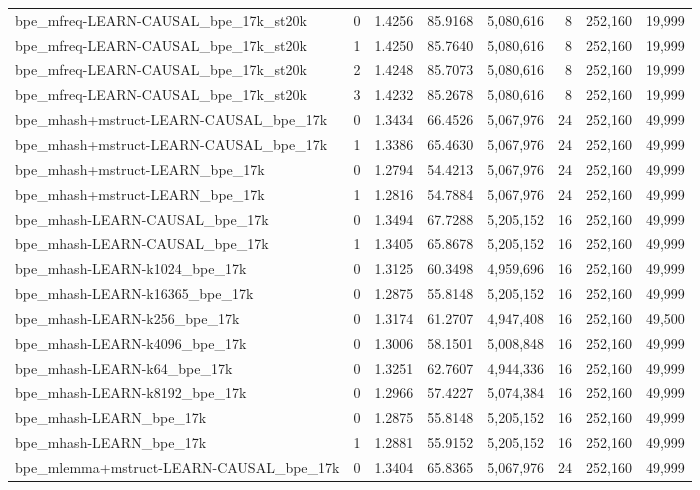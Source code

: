 \begin{tabular}{lrrrrrrr}
bpe\_mfreq-LEARN-CAUSAL\_bpe\_17k\_st20k & 0 & 1.4256 & 85.9168 & 5,080,616 & 8 & 252,160 & 19,999 \\
bpe\_mfreq-LEARN-CAUSAL\_bpe\_17k\_st20k & 1 & 1.4250 & 85.7640 & 5,080,616 & 8 & 252,160 & 19,999 \\
bpe\_mfreq-LEARN-CAUSAL\_bpe\_17k\_st20k & 2 & 1.4248 & 85.7073 & 5,080,616 & 8 & 252,160 & 19,999 \\
bpe\_mfreq-LEARN-CAUSAL\_bpe\_17k\_st20k & 3 & 1.4232 & 85.2678 & 5,080,616 & 8 & 252,160 & 19,999 \\
bpe\_mhash+mstruct-LEARN-CAUSAL\_bpe\_17k & 0 & 1.3434 & 66.4526 & 5,067,976 & 24 & 252,160 & 49,999 \\
bpe\_mhash+mstruct-LEARN-CAUSAL\_bpe\_17k & 1 & 1.3386 & 65.4630 & 5,067,976 & 24 & 252,160 & 49,999 \\
bpe\_mhash+mstruct-LEARN\_bpe\_17k & 0 & 1.2794 & 54.4213 & 5,067,976 & 24 & 252,160 & 49,999 \\
bpe\_mhash+mstruct-LEARN\_bpe\_17k & 1 & 1.2816 & 54.7884 & 5,067,976 & 24 & 252,160 & 49,999 \\
bpe\_mhash-LEARN-CAUSAL\_bpe\_17k & 0 & 1.3494 & 67.7288 & 5,205,152 & 16 & 252,160 & 49,999 \\
bpe\_mhash-LEARN-CAUSAL\_bpe\_17k & 1 & 1.3405 & 65.8678 & 5,205,152 & 16 & 252,160 & 49,999 \\
bpe\_mhash-LEARN-k1024\_bpe\_17k & 0 & 1.3125 & 60.3498 & 4,959,696 & 16 & 252,160 & 49,999 \\
bpe\_mhash-LEARN-k16365\_bpe\_17k & 0 & 1.2875 & 55.8148 & 5,205,152 & 16 & 252,160 & 49,999 \\
bpe\_mhash-LEARN-k256\_bpe\_17k & 0 & 1.3174 & 61.2707 & 4,947,408 & 16 & 252,160 & 49,500 \\
bpe\_mhash-LEARN-k4096\_bpe\_17k & 0 & 1.3006 & 58.1501 & 5,008,848 & 16 & 252,160 & 49,999 \\
bpe\_mhash-LEARN-k64\_bpe\_17k & 0 & 1.3251 & 62.7607 & 4,944,336 & 16 & 252,160 & 49,999 \\
bpe\_mhash-LEARN-k8192\_bpe\_17k & 0 & 1.2966 & 57.4227 & 5,074,384 & 16 & 252,160 & 49,999 \\
bpe\_mhash-LEARN\_bpe\_17k & 0 & 1.2875 & 55.8148 & 5,205,152 & 16 & 252,160 & 49,999 \\
bpe\_mhash-LEARN\_bpe\_17k & 1 & 1.2881 & 55.9152 & 5,205,152 & 16 & 252,160 & 49,999 \\
bpe\_mlemma+mstruct-LEARN-CAUSAL\_bpe\_17k & 0 & 1.3404 & 65.8365 & 5,067,976 & 24 & 252,160 & 49,999 \\

\end{tabular}
